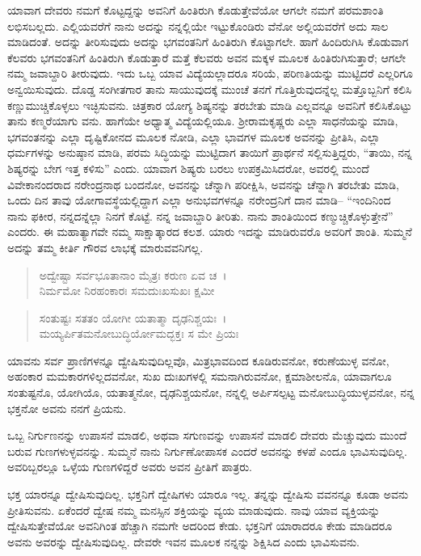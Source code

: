 ಯಾವಾಗ ದೇವರು ನಮಗೆ ಕೊಟ್ಟದ್ದನ್ನು ಅವನಿಗೆ ಹಿಂತಿರುಗಿ ಕೊಡುತ್ತೇವೆಯೋ ಆಗಲೇ ನಮಗೆ ಪರಮಶಾಂತಿ ಲಭಿಸಬಲ್ಲದು. ಎಲ್ಲಿಯವರೆಗೆ ನಾನು ಅದನ್ನು ನನ್ನಲ್ಲಿಯೇ ಇಟ್ಟುಕೊಂಡಿರು ವೆನೋ ಅಲ್ಲಿಯವರೆಗೆ ಅದು ಸಾಲ ಮಾಡಿದಂತೆ. ಅದನ್ನು ತೀರಿಸುವುದು ಅದನ್ನು ಭಗವಂತನಿಗೆ ಹಿಂತಿರುಗಿ ಕೊಟ್ಟಾಗಲೇ. ಹಾಗೆ ಹಿಂದಿರುಗಿಸಿ ಕೊಡುವಾಗ ಕೆಲವರು ಭಗವಂತನಿಗೆ ಹಿಂತಿರುಗಿ ಕೊಡುತ್ತಾರೆ ಮತ್ತೆ ಕೆಲವರು ಅವನ ಮಕ್ಕಳ ಮೂಲಕ ಹಿಂತಿರುಗಿಸುತ್ತಾರೆ; ಆಗಲೇ ನಮ್ಮ ಜವಾಬ್ದಾರಿ ತೀರುವುದು. ಇದು ಒಬ್ಬ ಯಾವ ವಿದ್ಯೆಯಲ್ಲಾದರೂ ಸರಿಯೆ, ಪರಿಣತಿಯನ್ನು ಮುಟ್ಟಿದರೆ ಎಲ್ಲರಿಗೂ ಅನ್ವಯಿಸುವುದು. ದೊಡ್ಡ ಸಂಗೀತಗಾರ ತಾನು ಸಾಯುವುದಕ್ಕೆ ಮುಂಚೆ ತನಗೆ ಗೊತ್ತಿರುವುದನ್ನೆಲ್ಲ ಮತ್ತೊಬ್ಬನಿಗೆ ಕಲಿಸಿ ಕಣ್ಣುಮುಚ್ಚಿಕೊಳ್ಳಲು ಇಚ್ಛಿಸುವನು. ಚಿತ್ರಕಾರ ಯೋಗ್ಯ ಶಿಷ್ಯನನ್ನು ತರಬೇತು ಮಾಡಿ ಎಲ್ಲವನ್ನೂ ಅವನಿಗೆ ಕಲಿಸಿಕೊಟ್ಟು ತಾನು ಕಣ್ಮರೆಯಾಗು ವನು. ಹಾಗೆಯೇ ಅಧ್ಯಾತ್ಮ ವಿದ್ಯೆಯಲ್ಲಿಯೂ. ಶ‍್ರೀರಾಮಕೃಷ್ಣರು ಎಲ್ಲಾ ಸಾಧನೆಯನ್ನು ಮಾಡಿ, ಭಗವಂತನನ್ನು ಎಲ್ಲಾ ದೃಷ್ಟಿಕೋನದ ಮೂಲಕ ನೋಡಿ, ಎಲ್ಲಾ ಭಾವಗಳ ಮೂಲಕ ಅವನನ್ನು ಪ್ರೀತಿಸಿ, ಎಲ್ಲಾ ಧರ್ಮಗಳನ್ನು ಅನುಷ್ಠಾನ ಮಾಡಿ, ಪರಮ ಸಿದ್ಧಿಯನ್ನು ಮುಟ್ಟಿದಾಗ ತಾಯಿಗೆ ಪ್ರಾರ್ಥನೆ ಸಲ್ಲಿಸುತ್ತಿದ್ದರು, “ತಾಯಿ, ನನ್ನ ಶಿಷ್ಯರನ್ನು ಬೇಗ ಇತ್ತ ಕಳಿಸು” ಎಂದು. ಯಾವಾಗ ಶಿಷ್ಯರು ಬರಲು ಉಪಕ್ರಮಿಸಿದರೋ, ಅವರಲ್ಲಿ ಮುಂದೆ ವಿವೇಕಾನಂದರಾದ ನರೇಂದ್ರನಾಥ ಬಂದನೋ, ಅವನನ್ನು ಚೆನ್ನಾಗಿ ಪರೀಕ್ಷಿಸಿ, ಅವನನ್ನು ಚೆನ್ನಾಗಿ ತರಬೇತು ಮಾಡಿ, ಒಂದು ದಿನ ತಾವು ಯೋಗಾವಸ್ಥೆಯಲ್ಲಿದ್ದಾಗ ಎಲ್ಲಾ ಅನುಭವಗಳನ್ನೂ ನರೇಂದ್ರನಿಗೆ ದಾನ ಮಾಡಿ– “ಇಂದಿನಿಂದ ನಾನು ಫಕೀರ, ನನ್ನದನ್ನೆಲ್ಲಾ ನಿನಗೆ ಕೊಟ್ಟೆ. ನನ್ನ ಜವಾಬ್ದಾರಿ ತೀರಿತು. ನಾನು ಶಾಂತಿಯಿಂದ ಕಣ್ಮುಚ್ಚಿಕೊಳ್ಳುತ್ತೇನೆ” ಎಂದರು. ಈ ಮಹಾತ್ಯಾಗವೇ ನಮ್ಮ ಸಾಕ್ಷಾತ್ಕಾರದ ಕಲಶ. ಯಾರು ಇದನ್ನು ಮಾಡಿರುವರೊ ಅವರಿಗೆ ಶಾಂತಿ. ಸುಮ್ಮನೆ ಅದನ್ನು ತಮ್ಮ ಕೀರ್ತಿ ಗೌರವ ಲಾಭಕ್ಕೆ ಮಾರುವವನಿಗಲ್ಲ.

\begin{verse}
ಅದ್ವೇಷ್ಟಾ ಸರ್ವಭೂತಾನಾಂ ಮೈತ್ರಃ ಕರುಣ ಏವ ಚ~।\\ನಿರ್ಮಮೋ ನಿರಹಂಕಾರಃ ಸಮದುಃಖಸುಖಃ ಕ್ಷಮೀ 
\end{verse}

\begin{verse}
ಸಂತುಷ್ಟಃ ಸತತಂ ಯೋಗೀ ಯತಾತ್ಮಾ ದೃಢನಿಶ್ಚಯಃ~।\\ಮಯ್ಯರ್ಪಿತಮನೋಬುದ್ಧಿರ್ಯೋಮದ್ಭಕ್ತಃ ಸ ಮೇ ಪ್ರಿಯಃ 
\end{verse}

{\small ಯಾವನು ಸರ್ವ ಪ್ರಾಣಿಗಳನ್ನೂ ದ್ವೇಷಿಸುವುದಿಲ್ಲವೊ, ಮಿತ್ರಭಾವದಿಂದ ಕೂಡಿರುವನೋ, ಕರುಣೆಯುಳ್ಳ ವನೋ, ಅಹಂಕಾರ ಮಮಕಾರಗಳಿಲ್ಲದವನೋ, ಸುಖ ದುಃಖಗಳಲ್ಲಿ ಸಮನಾಗಿರುವನೋ, ಕ್ಷಮಾಶೀಲನೊ, ಯಾವಾಗಲೂ ಸಂತುಷ್ಟನೊ, ಯೋಗಿಯೊ, ಯತಾತ್ಮನೋ, ದೃಢನಿಶ್ಚಯನೋ, ನನ್ನಲ್ಲಿ ಅರ್ಪಿಸಲ್ಪಟ್ಟ ಮನೋಬುದ್ಧಿಯುಳ್ಳವನೋ, ನನ್ನ ಭಕ್ತನೋ ಅವನು ನನಗೆ ಪ್ರಿಯನು.}

ಒಬ್ಬ ನಿರ್ಗುಣನನ್ನು ಉಪಾಸನೆ ಮಾಡಲಿ, ಅಥವಾ ಸಗುಣವನ್ನು ಉಪಾಸನೆ ಮಾಡಲಿ ದೇವರು ಮೆಚ್ಚುವುದು ಮುಂದೆ ಬರುವ ಗುಣಗಳುಳ್ಳವನನ್ನು. ಸುಮ್ಮನೆ ನಾನು ನಿರ್ಗುಣೋಪಾಸಕ ಎಂದರೆ ಅವನನ್ನು ಕಳಪೆ ಎಂದೂ ಭಾವಿಸುವುದಿಲ್ಲ. ಅವರಿಬ್ಬರಲ್ಲೂ ಒಳ್ಳೆಯ ಗುಣಗಳಿದ್ದರೆ ಅವರು ಅವನ ಪ್ರೀತಿಗೆ ಪಾತ್ರರು.

ಭಕ್ತ ಯಾರನ್ನೂ ದ್ವೇಷಿಸುವುದಿಲ್ಲ. ಭಕ್ತನಿಗೆ ದ್ವೇಷಿಗಳು ಯಾರೂ ಇಲ್ಲ. ತನ್ನನ್ನು ದ್ವೇಷಿಸು ವವನನ್ನೂ ಕೂಡಾ ಅವನು ಪ್ರೀತಿಸುವನು. ಏಕೆಂದರೆ ದ್ವೇಷ ನಮ್ಮ ಮನಸ್ಸಿನ ಶಕ್ತಿಯನ್ನು ವ್ಯಯ ಮಾಡುವುದು. ನಾವು ಯಾವ ವ್ಯಕ್ತಿಯನ್ನು ದ್ವೇಷಿಸುತ್ತೇವೆಯೋ ಅವನಿಗಿಂತ ಹೆಚ್ಚಾಗಿ ನಮಗೇ ಅದರಿಂದ ಕೇಡು. ಭಕ್ತನಿಗೆ ಯಾರಾದರೂ ಕೇಡು ಮಾಡಿದರೂ ಅವನು ಅವರನ್ನು ದ್ವೇಷಿಸುವುದಿಲ್ಲ. ದೇವರೇ ಇವನ ಮೂಲಕ ನನ್ನನ್ನು ಶಿಕ್ಷಿಸಿದ ಎಂದು ಭಾವಿಸುವನು.


